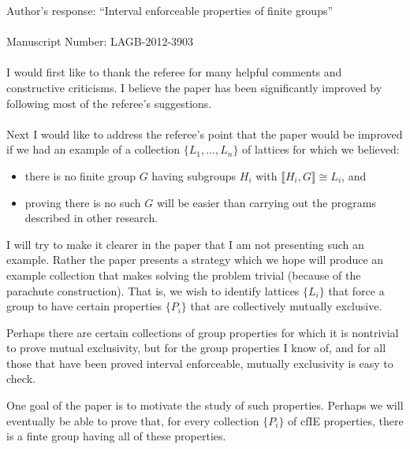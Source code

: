 \documentclass{article}
\newcommand{\lb}{\ensuremath{\llbracket}}
\newcommand{\rb}{\ensuremath{\rrbracket}}
\begin{document}
\noindent Author's response: ``Interval enforceable properties of finite groups''\\
\\
Manuscript Number: LAGB-2012-3903\\
\\
I would first like to thank the referee for many helpful comments and constructive
criticisms.  I believe the paper has been significantly improved by following
most of the referee's suggestions.\\
\\
Next I would like to address the referee's point that the paper would be
improved if we had an example of a collection $\{L_1, \dots, L_n\}$ of
lattices for which we believed:
\begin{itemize}
\item 
 there is no finite group $G$ having subgroups $H_i$ with $\lb H_i, G\rb
\cong L_i$, and 
\item proving there is no such $G$ will be easier than carrying out the programs
  described in other research.
\end{itemize}
I will try to make it clearer in the paper that I am not presenting such an
example.  Rather the paper presents a strategy which we hope will produce an
example collection that makes solving the problem trivial (because of the
parachute construction).  That is, we wish to identify lattices $\{L_i\}$ that force a
group to have certain properties $\{P_i\}$ that are collectively mutually exclusive.  

Perhaps there are certain collections of group properties for which it is
nontrivial to prove mutual exclusivity, but for the group properties I know of,
and for all those that have been proved interval enforceable, mutually
exclusivity is easy to check. 

One goal of the paper is to motivate the study of such properties.  Perhaps we
will eventually be able to prove that, for every collection $\{P_i\}$ of
\acs{cfIE} properties, there is a finte group having all of these properties.
\end{document}
